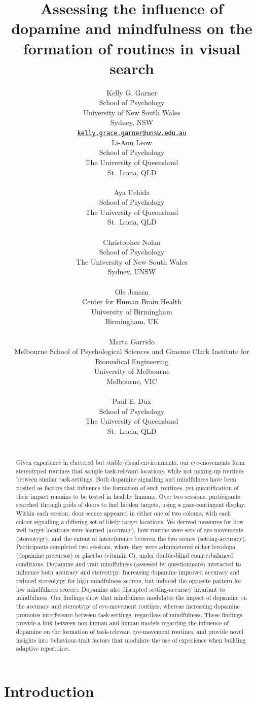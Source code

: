 \documentclass{article}
\title{Assessing the influence of dopamine and mindfulness on the
formation of routines in visual search}
\author{
    Kelly G. Garner
   \\
    School of Psychology \\
    University of New South Wales \\
  Sydney, NSW \\
  \texttt{\href{mailto:kelly.grace.garner@unsw.edu.au}{\nolinkurl{kelly.grace.garner@unsw.edu.au}}} \\
   \And
    Li-Ann Leow
   \\
    School of Psychology \\
    The University of Queensland \\
  St.~Lucia, QLD \\
  \texttt{} \\
   \And
    Aya Uchida
   \\
    School of Psychology \\
    The University of Queensland \\
  St.~Lucia, QLD \\
  \texttt{} \\
   \And
    Christopher Nolan
   \\
    School of Psychology \\
    The University of New South Wales \\
  Sydney, UNSW \\
  \texttt{} \\
   \And
    Ole Jensen
   \\
    Center for Human Brain Health \\
    University of Birmingham \\
  Birmingham, UK \\
  \texttt{} \\
   \And
    Marta Garrido
   \\
    Melbourne School of Psychological Sciences and Graeme Clark
Institute for Biomedical Engineering \\
    University of Melbourne \\
  Melbourne, VIC \\
  \texttt{} \\
   \And
    Paul E. Dux
   \\
    School of Psychology \\
    The University of Queensland \\
  St.~Lucia, QLD \\
  \texttt{} \\
  }
\begin{document}
\maketitle


\begin{abstract}
Given experience in cluttered but stable visual environments, our
eye-movements form stereotyped routines that sample task-relevant
locations, while not mixing-up routines between similar task-settings.
Both dopamine signalling and mindfulness have been posited as factors
that influence the formation of such routines, yet quantification of
their impact remains to be tested in healthy humans. Over two sessions,
participants searched through grids of doors to find hidden targets,
using a gaze-contingent display. Within each session, door scenes
appeared in either one of two colours, with each colour signalling a
differing set of likely target locations. We derived measures for how
well target locations were learned (accuracy), how routine were sets of
eye-movements (stereotypy), and the extent of intereference between the
two scenes (setting-accuracy). Participants completed two sessions,
where they were administered either levodopa (dopamine precursor) or
placebo (vitamin C), under double-blind counterbalanced conditions.
Dopamine and trait mindfulness (assessed by questionnaire) interacted to
influence both accuracy and stereotypy. Increasing dopamine improved
accuracy and reduced stereotypy for high mindfulness scorers, but
induced the opposite pattern for low mindfulness scorers. Dopamine also
disrupted setting-accuracy invariant to mindfulness. Our findings show
that mindfulness modulates the impact of dopamine on the accuracy and
stereotypy of eye-movement routines, whereas increasing dopamine
promotes interference between task-settings, regardless of mindfulness.
These findings provide a link between non-human and human models
regarding the influence of dopamine on the formation of task-relevant
eye-movement routines, and provide novel insights into behaviour-trait
factors that modulate the use of experience when building adaptive
repertoires.
\end{abstract}


\hypertarget{introduction}{%
\section{Introduction}\label{introduction}}
\end{document}
